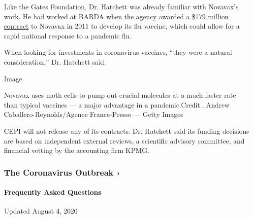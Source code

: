 Like the Gates Foundation, Dr. Hatchett was already familiar with
Novavax's work. He had worked at BARDA
\href{https://www.prnewswire.com/news-releases/novavax-awarded-hhs-barda-contract-valued-at-up-to-179-million-to-develop-pandemic-and-seasonal-influenza-vaccines-for-us-government-using-recombinant-vlp-technology-117145058.html}{when
the agency awarded a \$179 million contract} to Novavax in 2011 to
develop its flu vaccine, which could allow for a rapid national response
to a pandemic flu.

When looking for investments in coronavirus vaccines, ``they were a
natural consideration,'' Dr. Hatchett said.

Image

Novavax uses moth cells to pump out crucial molecules at a much faster
rate than typical vaccines --- a major advantage in a
pandemic.Credit...Andrew Caballero-Reynolds/Agence France-Presse ---
Getty Images

CEPI will not release any of its contracts. Dr. Hatchett said its
funding decisions are based on independent external reviews, a
scientific advisory committee, and financial vetting by the accounting
firm KPMG.

\href{https://www.nytimes.com/news-event/coronavirus?action=click\&pgtype=Article\&state=default\&region=MAIN_CONTENT_3\&context=storylines_faq}{}

\hypertarget{the-coronavirus-outbreak-}{%
\subsubsection{The Coronavirus Outbreak
›}\label{the-coronavirus-outbreak-}}

\hypertarget{frequently-asked-questions}{%
\paragraph{Frequently Asked
Questions}\label{frequently-asked-questions}}

Updated August 4, 2020


